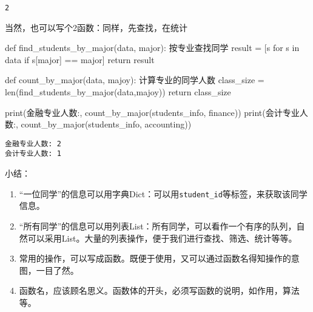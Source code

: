 \documentclass[
  letterpaper,
  DIV=11,
  numbers=noendperiod]{scrreprt}
\newenvironment{Shaded}{\begin{snugshade}}{\end{snugshade}}
\newcommand{\BuiltInTok}[1]{\textcolor[rgb]{0.00,0.23,0.31}{#1}}
\newcommand{\CommentTok}[1]{\textcolor[rgb]{0.37,0.37,0.37}{#1}}
\newcommand{\ControlFlowTok}[1]{\textcolor[rgb]{0.00,0.23,0.31}{#1}}
\newcommand{\KeywordTok}[1]{\textcolor[rgb]{0.00,0.23,0.31}{#1}}
\newcommand{\NormalTok}[1]{\textcolor[rgb]{0.00,0.23,0.31}{#1}}
\newcommand{\OperatorTok}[1]{\textcolor[rgb]{0.37,0.37,0.37}{#1}}
\newcommand{\StringTok}[1]{\textcolor[rgb]{0.13,0.47,0.30}{#1}}
\providecommand{\tightlist}{%
  \setlength{\itemsep}{0pt}\setlength{\parskip}{0pt}}\usepackage{longtable,booktabs,array}
\begin{document}
\begin{verbatim}
2
\end{verbatim}

当然，也可以写个2函数：同样，先查找，在统计

\begin{Shaded}
\begin{Highlighting}[]
\KeywordTok{def}\NormalTok{ find\_students\_by\_major(data, major):}
  \CommentTok{\textquotesingle{}\textquotesingle{}\textquotesingle{}}
\CommentTok{  按专业查找同学}
\CommentTok{  \textquotesingle{}\textquotesingle{}\textquotesingle{}}
\NormalTok{  result }\OperatorTok{=}\NormalTok{ [s }\ControlFlowTok{for}\NormalTok{ s }\KeywordTok{in}\NormalTok{ data }\ControlFlowTok{if}\NormalTok{ s[}\StringTok{\textquotesingle{}major\textquotesingle{}}\NormalTok{] }\OperatorTok{==}\NormalTok{ major]}
  \ControlFlowTok{return}\NormalTok{ result}

\KeywordTok{def}\NormalTok{ count\_by\_major(data, majoy):}
  \CommentTok{\textquotesingle{}\textquotesingle{}\textquotesingle{}}
\CommentTok{  计算专业的同学人数}
\CommentTok{  \textquotesingle{}\textquotesingle{}\textquotesingle{}}
\NormalTok{  class\_size }\OperatorTok{=} \BuiltInTok{len}\NormalTok{(find\_students\_by\_major(data,majoy))}
  \ControlFlowTok{return}\NormalTok{ class\_size}

\BuiltInTok{print}\NormalTok{(}\StringTok{\textquotesingle{}金融专业人数:\textquotesingle{}}\NormalTok{, count\_by\_major(students\_info, }\StringTok{\textquotesingle{}finance\textquotesingle{}}\NormalTok{))}
\BuiltInTok{print}\NormalTok{(}\StringTok{\textquotesingle{}会计专业人数:\textquotesingle{}}\NormalTok{, count\_by\_major(students\_info, }\StringTok{\textquotesingle{}accounting\textquotesingle{}}\NormalTok{))}
\end{Highlighting}
\end{Shaded}

\begin{verbatim}
金融专业人数: 2
会计专业人数: 1
\end{verbatim}

小结：

\begin{enumerate}
\def\labelenumi{\arabic{enumi}.}
\tightlist
\item
  ``一位同学''的信息可以用字典Dict：可以用\texttt{student\_id}等标签，来获取该同学信息。
\item
  ``所有同学''的信息可以用列表List：所有同学，可以看作一个有序的队列，自然可以采用List。大量的列表操作，便于我们进行查找、筛选、统计等等。
\item
  常用的操作，可以写成函数。既便于使用，又可以通过函数名得知操作的意图，一目了然。
\item
  函数名，应该顾名思义。函数体的开头，必须写函数的说明，如作用，算法等。
\end{enumerate}
\end{document}
